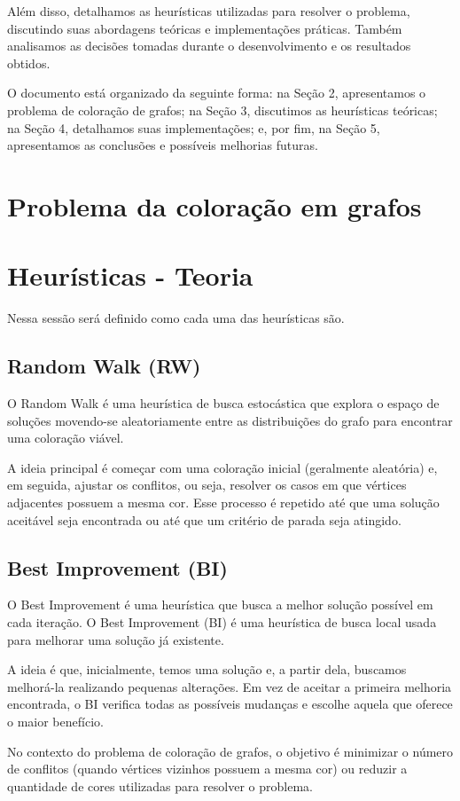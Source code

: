 \documentclass[12pt,a4paper]{article}
\begin{document}
Além disso, detalhamos as heurísticas utilizadas para resolver o problema, discutindo suas abordagens teóricas e implementações práticas. Também analisamos as decisões tomadas durante o desenvolvimento e os resultados obtidos.

O documento está organizado da seguinte forma: na Seção 2, apresentamos o problema de coloração de grafos; na Seção 3, discutimos as heurísticas teóricas; na Seção 4, detalhamos suas implementações; e, por fim, na Seção 5, apresentamos as conclusões e possíveis melhorias futuras.
\section{Problema da coloração em grafos}

\section{Heurísticas - Teoria}
Nessa sessão será definido como cada uma das heurísticas são.

\subsection{Random Walk (RW)}
O Random Walk é uma heurística de busca estocástica que explora o espaço de soluções movendo-se aleatoriamente entre as distribuições do grafo para encontrar uma coloração viável. 

A ideia principal é começar com uma coloração inicial (geralmente aleatória) e, em seguida, ajustar os conflitos, ou seja, resolver os casos em que vértices adjacentes possuem a mesma cor. Esse processo é repetido até que uma solução aceitável seja encontrada ou até que um critério de parada seja atingido.

\subsection{Best Improvement (BI)}
O Best Improvement é uma heurística que busca a melhor solução possível em cada iteração. O Best Improvement (BI) é uma heurística de busca local usada para melhorar uma solução já existente. 

A ideia é que, inicialmente, temos uma solução e, a partir dela, buscamos melhorá-la realizando pequenas alterações. Em vez de aceitar a primeira melhoria encontrada, o BI verifica todas as possíveis mudanças e escolhe aquela que oferece o maior benefício.

No contexto do problema de coloração de grafos, o objetivo é minimizar o número de conflitos (quando vértices vizinhos possuem a mesma cor) ou reduzir a quantidade de cores utilizadas para resolver o problema.
\end{document}
